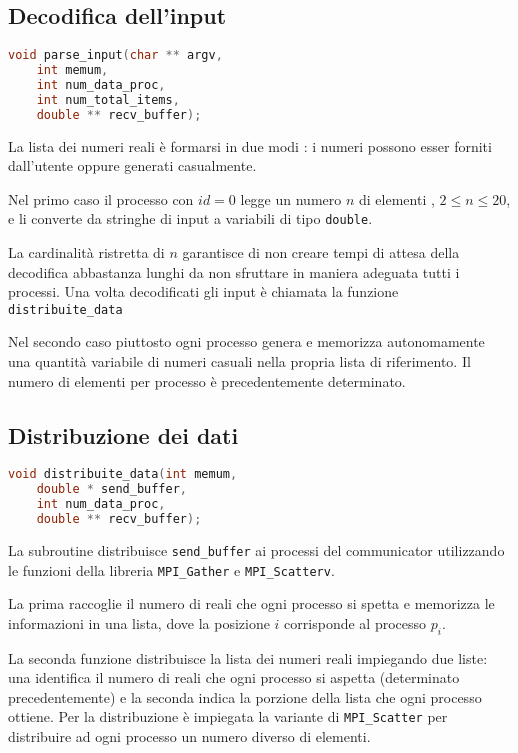 \documentclass[a4paper,11pt]{book}
\begin{document}
\subsection{Decodifica dell'input}
\begin{lstlisting}[language=C]
void parse_input(char ** argv, 
    int memum, 
    int num_data_proc, 
    int num_total_items, 
    double ** recv_buffer);
\end{lstlisting}
La lista dei numeri reali è formarsi in due modi : i numeri possono esser forniti dall'utente oppure generati casualmente.\par 
Nel primo caso il processo con $id=0$ legge un numero $n$ di elementi , $2 \leq n \leq 20$, e li converte da stringhe di input a variabili di tipo \verb|double|. \par 
La cardinalità ristretta di $n$ garantisce di non creare tempi di attesa della decodifica abbastanza lunghi da non sfruttare in maniera adeguata tutti i processi. Una volta decodificati gli input è chiamata la funzione \verb|distribuite_data| \par
Nel secondo caso piuttosto ogni processo genera e memorizza autonomamente una quantità variabile di numeri casuali nella propria lista di riferimento. Il numero di elementi per processo è precedentemente determinato. 

\subsection{Distribuzione dei dati}
\begin{lstlisting}[language=C]
void distribuite_data(int memum, 
    double * send_buffer, 
    int num_data_proc, 
    double ** recv_buffer);
\end{lstlisting}
La subroutine distribuisce \verb|send_buffer| ai processi del communicator utilizzando le funzioni della libreria \verb|MPI_Gather| e \verb|MPI_Scatterv|.\par 
La prima raccoglie il numero di reali che ogni processo si spetta e memorizza le informazioni in una lista, dove la posizione $i$ corrisponde al processo $p_i$. \par 
La seconda funzione distribuisce la lista dei numeri reali impiegando due liste: una identifica il numero di reali che ogni processo si aspetta (determinato precedentemente) e la seconda indica la porzione della lista che ogni processo ottiene. Per la distribuzione è impiegata la variante di \verb|MPI_Scatter| per distribuire ad ogni processo un numero diverso di elementi.
\end{document}
